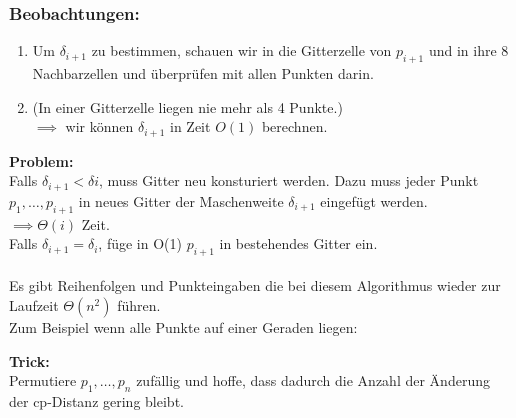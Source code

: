 \documentclass{article}
\begin{document}
\subsubsection{Beobachtungen:}
\begin{enumerate}
    \item Um $\delta_{i+1}$ zu bestimmen, schauen wir in die Gitterzelle von $p_{i+1}$ und in ihre 8 Nachbarzellen und überprüfen mit allen Punkten darin.
    \item (In einer Gitterzelle liegen nie mehr als 4 Punkte.)\\
    $\implies$ wir können $\delta_{i+1}$ in Zeit $O(1) $ berechnen.
\end{enumerate}



\textbf{Problem:}\\
Falls $\delta_{i+1} < \delta{i}$, muss Gitter neu konsturiert werden. Dazu muss jeder Punkt $p_1, \dots, p_{i+1}$ in neues Gitter
der Maschenweite $\delta_{i+1}$ eingefügt werden.\\
$\implies \varTheta(i)$ Zeit.\\
Falls $\delta_{i+1} = \delta_{i}$, füge in O(1) $p_{i+1}$ in bestehendes Gitter ein.\\
\\
Es gibt Reihenfolgen und Punkteingaben die bei diesem Algorithmus wieder zur Laufzeit $\varTheta(n^2)$ führen. \\
Zum Beispiel wenn alle Punkte auf einer Geraden liegen: \\


\textbf{Trick:} \\
Permutiere $p_1, \dots, p_n$ zufällig und hoffe, dass dadurch die Anzahl der Änderung der cp-Distanz gering bleibt.
\end{document}
